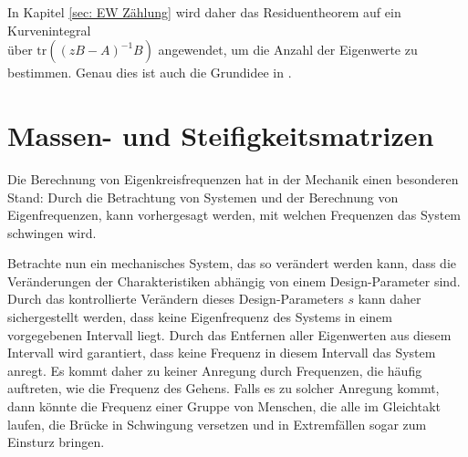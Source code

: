 \documentclass[a4paper,12pt]{report}
\newcommand{\tr}{\text{tr}}
\newcommand{\inv}{^{-1}}
\newcommand{\1}{\mathds{1}}
\theoremstyle{plain} %
\theoremstyle{definition} %
\theoremstyle{remark}
\begin{document}
            In Kapitel \ref{sec: EW Zählung} wird daher das Residuentheorem auf ein Kurvenintegral\\
            über $\tr((zB-A)\inv B)$ angewendet, um die Anzahl der Eigenwerte zu bestimmen.
            Genau dies ist auch die Grundidee in \cite{grundlageFutamura,hauptteilTkachuk}.
            
\chapter{Massen- und Steifigkeitsmatrizen}
\label{sec: MS Matrizen}
      Die Berechnung von Eigenkreisfrequenzen hat in der Mechanik einen besonderen Stand:
      Durch die Betrachtung von Systemen und der Berechnung von Eigenfrequenzen, kann vorhergesagt werden, mit welchen Frequenzen das System schwingen wird.

      Betrachte nun ein mechanisches System, das so verändert werden kann, dass die Veränderungen der Charakteristiken abhängig von einem Design-Parameter \s sind.
      Durch das kontrollierte Verändern dieses Design-Parameters $s$ kann daher sichergestellt werden, dass keine Eigenfrequenz des Systems in einem vorgegebenen Intervall liegt.
      Durch das Entfernen aller Eigenwerten aus diesem Intervall wird garantiert, dass keine Frequenz in diesem Intervall das System anregt.
      Es kommt daher zu keiner Anregung durch Frequenzen, die häufig auftreten, wie die Frequenz des Gehens.
      Falls es zu solcher Anregung kommt, dann könnte die Frequenz einer Gruppe von Menschen, die alle im Gleichtakt laufen, die Brücke in Schwingung versetzen und in Extremfällen sogar zum Einsturz bringen.
\end{document}
